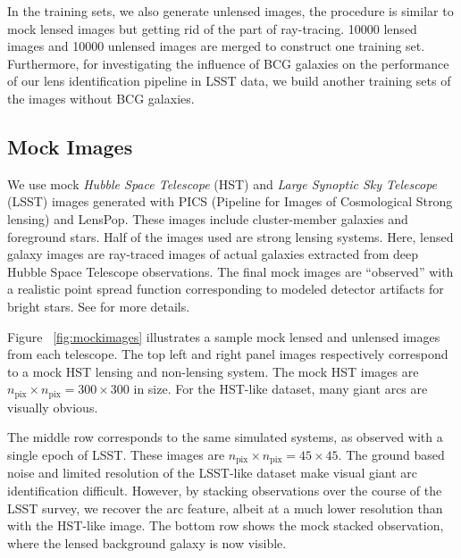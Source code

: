 \documentclass{emulateapj}
\begin{document}
In the training sets, we also generate unlensed images, the procedure
is similar to mock lensed images but getting rid of the part of
ray-tracing. 10000 lensed images and 10000 unlensed images are merged
to construct one training set. Furthermore, for investigating the
influence of BCG galaxies on the performance of our lens
identification pipeline in LSST data, we build another training sets
of the images without BCG galaxies.

\subsection{Mock Images}

We use mock {\em Hubble Space Telescope} (HST) and {\em Large Synoptic
  Sky Telescope} (LSST) images generated with PICS (Pipeline for
Images of Cosmological Strong lensing) \citep{li_etal16} and
LensPop\citep{collett_etal15}.  These images include cluster-member
galaxies and foreground stars.  Half of the images used are strong
lensing systems.  Here, lensed galaxy images are ray-traced images of
actual galaxies extracted from deep Hubble Space Telescope
observations.  The final mock images are ``observed'' with a realistic
point spread function corresponding to modeled detector artifacts for
bright stars.  See \cite{li_etal16} for more details.

Figure ~\ref{fig:mockimages} illustrates a sample mock lensed and
unlensed images from each telescope.  The top left and right panel
images respectively correspond to a mock HST lensing and non-lensing
system. The mock HST images are $n_\text{pix}\times
n_\text{pix}=300\times300$ in size.  For the HST-like dataset, many
giant arcs are visually obvious.

The middle row corresponds to the same simulated systems, as observed
with a single epoch of LSST.  These images are $n_\text{pix}\times
n_\text{pix}=45\times45$.  The ground based noise and limited
resolution of the LSST-like dataset make visual giant arc
identification difficult.  However, by stacking observations over the
course of the LSST survey, we recover the arc feature, albeit at a
much lower resolution than with the HST-like image. The bottom row
shows the mock stacked observation, where the lensed background galaxy
is now visible.
\end{document}
